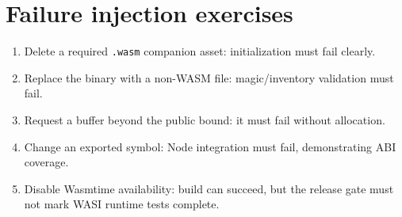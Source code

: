 \documentclass[11pt,letterpaper]{article}
\begin{document}
\section{Failure injection exercises}
\begin{enumerate}
\item Delete a required \texttt{.wasm} companion asset: initialization must fail clearly.
\item Replace the binary with a non-WASM file: magic/inventory validation must fail.
\item Request a buffer beyond the public bound: it must fail without allocation.
\item Change an exported symbol: Node integration must fail, demonstrating ABI coverage.
\item Disable Wasmtime availability: build can succeed, but the release gate must not mark WASI runtime tests complete.
\end{enumerate}
\end{document}
